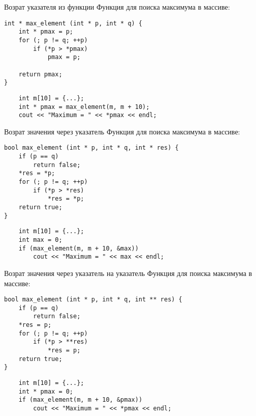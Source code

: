 \documentclass{beamer}
\begin{document}
\begin{frame}[fragile]{Возрат указателя из функции}
Функция для поиска максимума в массиве:
\begin{lstlisting}
int * max_element (int * p, int * q) {
    int * pmax = p;
    for (; p != q; ++p)
        if (*p > *pmax)
            pmax = p;

    return pmax;
}
\end{lstlisting}
\begin{lstlisting}
    int m[10] = {...};
    int * pmax = max_element(m, m + 10); 
    cout << "Maximum = " << *pmax << endl; 
\end{lstlisting}
\end{frame}

\begin{frame}[fragile]{Возрат значения через указатель}
Функция для поиска максимума в массиве:
\begin{lstlisting}
bool max_element (int * p, int * q, int * res) {
    if (p == q)
        return false;
    *res = *p;
    for (; p != q; ++p)
        if (*p > *res)
            *res = *p;
    return true;
}
\end{lstlisting}
\begin{lstlisting}
    int m[10] = {...};
    int max = 0;
    if (max_element(m, m + 10, &max)) 
        cout << "Maximum = " << max << endl; 
\end{lstlisting}
\end{frame}

\begin{frame}[fragile]{Возрат значения через указатель на указатель}
Функция для поиска максимума в массиве:
\begin{lstlisting}
bool max_element (int * p, int * q, int ** res) {
    if (p == q)
        return false;
    *res = p;
    for (; p != q; ++p)
        if (*p > **res)
            *res = p;
    return true;
}
\end{lstlisting}
\begin{lstlisting}
    int m[10] = {...};
    int * pmax = 0;
    if (max_element(m, m + 10, &pmax)) 
        cout << "Maximum = " << *pmax << endl; 
\end{lstlisting}
\end{frame}
\end{document}
